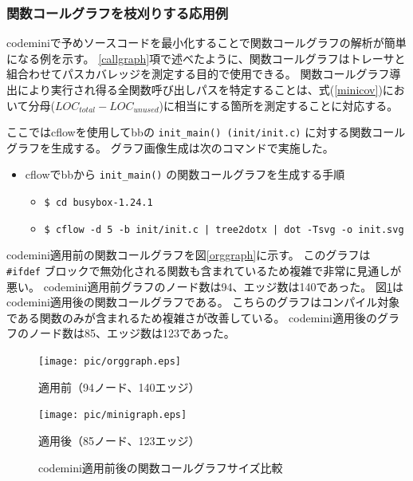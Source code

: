 \subsubsection{関数コールグラフを枝刈りする応用例}
\acrshort{codemini}で予めソースコードを最小化することで関数コールグラフの解析が簡単になる例を示す。
\ref{callgraph}項で述べたように、関数コールグラフはトレーサと組合わせてパスカバレッジを測定する目的で使用できる。
関数コールグラフ導出により実行され得る全関数呼び出しパスを特定することは、式(\ref{minicov})において分母($LOC_{total} - LOC_{unused}$)に相当にする箇所を測定することに対応する。
\par
ここでは\acrshort{cflow}を使用して\acrshort{bb}の \verb|init_main() (init/init.c)| に対する関数コールグラフを生成する。
グラフ画像生成は次のコマンドで実施した。
\begin{itemize}
  \item \acrshort{cflow}で\acrshort{bb}から \verb|init_main()| の関数コールグラフを生成する手順
  \begin{itemize}
    \item[] \verb!$ cd busybox-1.24.1!
    \item[] \verb!$ cflow -d 5 -b init/init.c | tree2dotx | dot -Tsvg -o init.svg!
  \end{itemize}
\end{itemize}
\par
\acrshort{codemini}適用前の関数コールグラフを図\ref{orggraph}に示す。
このグラフは \verb|#ifdef| ブロックで無効化される関数も含まれているため複雑で非常に見通しが悪い。
\acrshort{codemini}適用前グラフのノード数は94、エッジ数は140であった。
図\ref{minigraph}は\acrshort{codemini}適用後の関数コールグラフである。
こちらのグラフはコンパイル対象である関数のみが含まれるため複雑さが改善している。
\acrshort{codemini}適用後のグラフのノード数は85、エッジ数は123であった。
\begin{figure}[ht]
 \begin{minipage}{0.53\hsize}
  \begin{center}
   \texttt{[image: pic/orggraph.eps]}
  \end{center}
  \caption{適用前（94ノード、140エッジ）}
  \label{orggraph}
 \end{minipage}
 \begin{minipage}{0.47\hsize}
  \begin{center}
   \texttt{[image: pic/minigraph.eps]}
  \end{center}
  \caption{適用後（85ノード、123エッジ）}
  \label{minigraph}
 \end{minipage}
 \caption{\acrshort{codemini}適用前後の関数コールグラフサイズ比較}
\end{figure}
